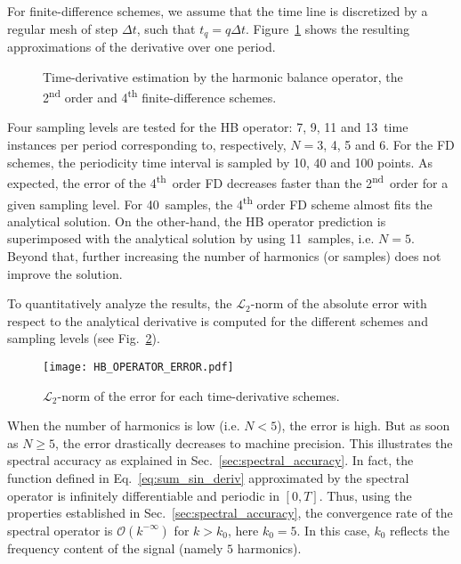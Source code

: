 For finite-difference schemes, 
we assume that the time line is discretized 
by a regular mesh of step $\Delta t$, such that $t_q = q \Delta t$.
Figure~\ref{fig:hb_operator_sample} shows the resulting approximations 
of the derivative over one period.
\begin{figure}[htb]
  \centering
  \caption{Time-derivative estimation by the harmonic balance operator,
  the 2\textsuperscript{nd} order and 4\textsuperscript{th} finite-difference schemes.}
  \label{fig:hb_operator_sample}
\end{figure}
Four sampling levels
are tested for the HB operator: 7, 9, 11 and 13~time instances per period
corresponding to, respectively, $N=3$, 4, 5 and 6.
For the FD schemes, the periodicity time interval is sampled by
10, 40 and 100 points.
As expected, the error of the 4\textsuperscript{th}~order FD
decreases faster  than the 2\textsuperscript{nd}~order for a given sampling level.
For 40~samples, the 4\textsuperscript{th} order FD
scheme almost fits the analytical solution. On the other-hand,
the HB operator prediction is superimposed with the analytical solution
by using 11~samples, i.e. $N=5$. Beyond that, further increasing the
number of harmonics (or samples)
does not improve the solution.

To quantitatively analyze the results, the 
$\mathcal{L}_2$-norm of the absolute error with respect to the analytical
derivative is computed for the different schemes and 
sampling levels (see Fig.~\ref{fig:hb_operator_error}).
\begin{figure}[htb]
  \centering
   \texttt{[image: HB\_OPERATOR\_ERROR.pdf]}
   \caption{$\mathcal{L}_2$-norm of the error for each time-derivative
   schemes.}
  \label{fig:hb_operator_error}
\end{figure}
When the number of harmonics is low 
(i.e. $N < 5$), the error is high. But as soon as $N \geq 5$, the error
drastically decreases to machine precision.
This illustrates the spectral accuracy as explained in 
Sec.~\ref{sec:spectral_accuracy}. In fact, the function defined
in Eq.~\eqref{eq:sum_sin_deriv} approximated by the spectral operator
is infinitely differentiable and periodic in $[0, T]$.
Thus, using the properties established in Sec.~\ref{sec:spectral_accuracy},
the convergence rate of the spectral operator is $\mathcal{O} (k^{-\infty})$
for $k > k_0$, here $k_0=5$. In this case, $k_0$
reflects the frequency content of the signal (namely $5$ harmonics).
